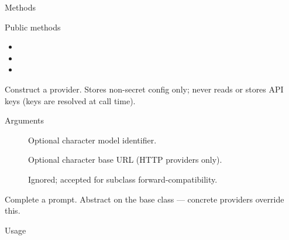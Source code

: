 \documentclass[a4paper]{book}
\begin{document}
%
\begin{Section}{Methods}
%
\begin{SubSection}{Public methods}
\begin{itemize}

\item{} 
\item{} 
\item{} 

\end{itemize}

\end{SubSection}



\hypertarget{method-ProviderBase-initialize}{}
%
\begin{SubSection}{}
Construct a provider. Stores non-secret config only; never
reads or stores API keys (keys are resolved at call time).
%

%
\begin{SubSubSection}{Arguments}

\begin{description}

\item[] Optional character model identifier.
\item[] Optional character base URL (HTTP providers only).
\item[] Ignored; accepted for subclass forward-compatibility.

\end{description}



\end{SubSubSection}

\end{SubSection}




\hypertarget{method-ProviderBase-complete}{}
%
\begin{SubSection}{}
Complete a prompt. Abstract on the base class — concrete
providers override this.
%
\begin{SubSubSection}{Usage}


\end{SubSubSection}
\end{SubSection}
\end{Section}
\end{document}
